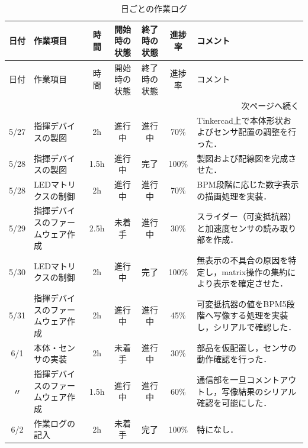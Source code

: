 \documentclass[uplatex,dvipdfmx,a4paper,11pt]{jsarticle}
\begin{document}
    \begin{longtable}{|c|p{3cm}|c|c|c|c|p{5cm}|}
    \caption{日ごとの作業ログ} \\
    \hline
    日付 & 作業項目 & 時間 & 開始時の状態 & 終了時の状態 & 進捗率 & コメント \\
    \hline
    \endfirsthead

    \hline
    日付 & 作業項目 & 時間 & 開始時の状態 & 終了時の状態 & 進捗率 & コメント \\
    \hline
    \endhead

    \hline
    \multicolumn{7}{r}{次ページへ続く} \\
    \hline
    \endfoot

    \hline
    \endlastfoot

    5/27 & 指揮デバイスの製図 & 2h &
    進行中 &
    進行中 &
    70\% &
    Tinkercad上で本体形状およびセンサ配置の調整を行った． \\
    \hline

    5/28 & 指揮デバイスの製図 & 1.5h &
    進行中 &
    完了 &
    100\% &
    製図および配線図を完成させた． \\
    \hline

    5/28 & LEDマトリクスの制御 & 2h &
    進行中 &
    進行中 &
    70\% &
    BPM段階に応じた数字表示の描画処理を実装． \\
    \hline

    5/29 & 指揮デバイスのファームウェア作成 & 2.5h &
    未着手 &
    進行中 &
    30\% &
    スライダー（可変抵抗器）と加速度センサの読み取り部を作成． \\
    \hline

    5/30 & LEDマトリクスの制御 & 2h &
    進行中 &
    完了 &
    100\% &
    無表示の不具合の原因を特定し，matrix操作の集約により表示を確定させた． \\
    \hline

    5/31 & 指揮デバイスのファームウェア作成 & 2h &
    進行中 &
    進行中 &
    45\% &
    可変抵抗器の値をBPM5段階へ写像する処理を実装し，シリアルで確認した． \\
    \hline

    6/1 & 本体・センサの実装 & 2h &
    未着手 &
    進行中 &
    30\% &
    部品を仮配置し，センサの動作確認を行った． \\
    \hline

    〃 & 指揮デバイスのファームウェア作成 & 1.5h &
    進行中 &
    進行中 &
    60\% &
    通信部を一旦コメントアウトし，写像結果のシリアル確認を可能にした． \\
    \hline

    6/2 & 作業ログの記入 & 2h &
    未着手 &
    完了 &
    100\% &
    特になし． \\

    \end{longtable}
\end{document}
